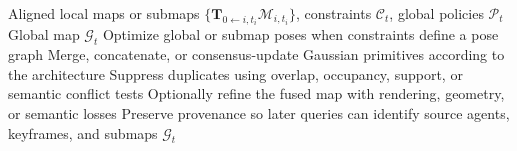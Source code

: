 \documentclass[11pt, a4paper, logo]{googledeepmind}
\begin{document}
\begin{algorithm}[H]
\caption{Global Gaussian fusion}
\label{alg:app-global-fusion}
\small
\begin{algorithmic}[1]
  \Require Aligned local maps or submaps $\{\mathbf{T}_{0\leftarrow i,t_i}\mathcal{M}_{i,t_i}\}$, constraints $\mathcal{C}_t$, global policies $\mathcal{P}_t$
  \Ensure Global map $\mathcal{G}_t$
  \State Optimize global or submap poses when constraints define a pose graph
  \State Merge, concatenate, or consensus-update Gaussian primitives according to the architecture
  \State Suppress duplicates using overlap, occupancy, support, or semantic conflict tests
  \State Optionally refine the fused map with rendering, geometry, or semantic losses
  \State Preserve provenance so later queries can identify source agents, keyframes, and submaps
  \State \Return $\mathcal{G}_t$
\end{algorithmic}
\end{algorithm}
\end{document}
